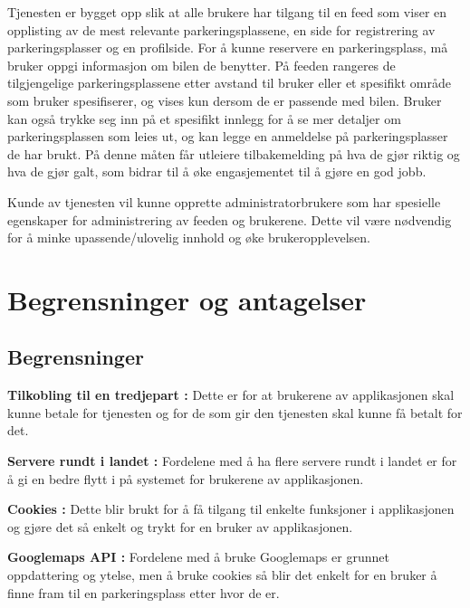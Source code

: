 \documentclass[12pt]{article}
\begin{document}
Tjenesten er bygget opp slik at alle brukere har tilgang til en feed som viser en opplisting av de mest relevante parkeringsplassene, en side for registrering av parkeringsplasser og en profilside. For å kunne reservere en parkeringsplass, må bruker oppgi informasjon om bilen de benytter. På feeden rangeres de tilgjengelige parkeringsplassene etter avstand til bruker eller et spesifikt område som bruker spesifiserer, og vises kun dersom de er passende med bilen. Bruker kan også trykke seg inn på et spesifikt innlegg for å se mer detaljer om parkeringsplassen som leies ut, og kan legge en anmeldelse på parkeringsplasser de har brukt. På denne måten får utleiere tilbakemelding på hva de gjør riktig og hva de gjør galt, som bidrar til å øke engasjementet til å gjøre en god jobb.

Kunde av tjenesten vil kunne opprette administratorbrukere som har spesielle egenskaper for administrering av feeden og brukerene. Dette vil være nødvendig for å minke upassende/ulovelig innhold og øke brukeropplevelsen.

\section{Begrensninger og antagelser}

    \subsection{Begrensninger}
    \textbf{Tilkobling til en tredjepart :} Dette er for at brukerene av applikasjonen skal kunne betale for tjenesten og for de som gir den tjenesten skal kunne få betalt for det.
    
    \textbf{Servere rundt i landet :} Fordelene med å ha flere servere rundt i landet er for å gi en bedre flytt i på systemet for brukerene av applikasjonen.
    
    \textbf{Cookies :} Dette blir brukt for å få tilgang til enkelte funksjoner i applikasjonen og gjøre det så enkelt og trykt for en bruker av applikasjonen.
    
    \textbf{Googlemaps API :} Fordelene med å bruke Googlemaps er grunnet oppdattering og ytelse, men å bruke cookies så blir det enkelt for en bruker å finne fram til en parkeringsplass etter hvor de er. 
\end{document}
